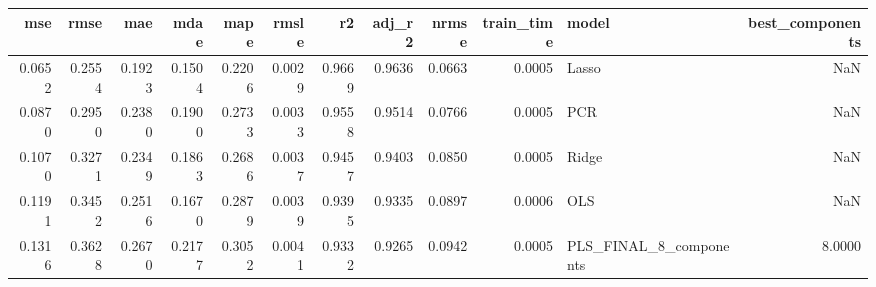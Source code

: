 \begin{tabular}{rrrrrrrrrrlr}
\toprule
mse & rmse & mae & mdae & mape & rmsle & r2 & adj_r2 & nrmse & train_time & model & best_components \\
\midrule
0.0652 & 0.2554 & 0.1923 & 0.1504 & 0.2206 & 0.0029 & 0.9669 & 0.9636 & 0.0663 & 0.0005 & Lasso & NaN \\
0.0870 & 0.2950 & 0.2380 & 0.1900 & 0.2733 & 0.0033 & 0.9558 & 0.9514 & 0.0766 & 0.0005 & PCR & NaN \\
0.1070 & 0.3271 & 0.2349 & 0.1863 & 0.2686 & 0.0037 & 0.9457 & 0.9403 & 0.0850 & 0.0005 & Ridge & NaN \\
0.1191 & 0.3452 & 0.2516 & 0.1670 & 0.2879 & 0.0039 & 0.9395 & 0.9335 & 0.0897 & 0.0006 & OLS & NaN \\
0.1316 & 0.3628 & 0.2670 & 0.2177 & 0.3052 & 0.0041 & 0.9332 & 0.9265 & 0.0942 & 0.0005 & PLS_FINAL_8_components & 8.0000 \\
\bottomrule
\end{tabular}
